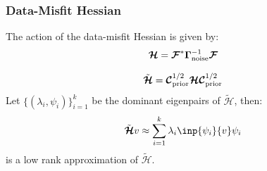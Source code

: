 \documentclass[
  pdf,
  10pt,
  xcolor={svgnames},
]{beamer}
\newcommand{\mcb}[1]{\boldsymbol{\mathcal{#1}}}
\newcommand{\mat}[1]{\mathbf{{#1}}}
\begin{document}
\begin{frame}
  \frametitle{Data-Misfit Hessian}
  \begin{definition}
    The action of the data-misfit Hessian is given by:
    \begin{equation*}
      \mcb{H} = \mcb{F}^* \mat{\Gamma}_{\rm noise}^{-1} \mcb{F}
    \end{equation*}
  \end{definition}
  \pause
  \begin{definition}
    \begin{equation*}
      \tilde{\mcb{H}}
      = \mcb{C}_{\rm prior}^{1/2} \mcb{H} \mcb{C}_{\rm prior}^{1/2}
    \end{equation*}
    Let $\{(\lambda_i, \psi_i)\}_{i=1}^k$ be the dominant eigenpairs of
    $\tilde{\mcb{H}}$, then:
    \[
      \tilde{\mcb{H}} v \approx \sum_{i=1}^k \lambda_i \inp{\psi_i}{v} \psi_i
    \]
    is a low rank approximation of $\tilde{\mcb{H}}$.
  \end{definition}
\end{frame}
\end{document}
